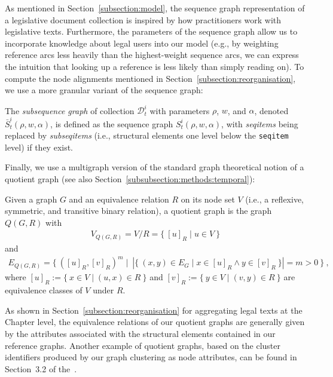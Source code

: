 As mentioned in Section~\ref{subsection:model},
the sequence graph representation of a legislative document collection is inspired by how practitioners work with legislative texts.
Furthermore, the parameters of the sequence graph allow us to incorporate knowledge about legal users into our model 
(e.g., by weighting reference arcs less heavily than the highest-weight sequence arcs, we can express the intuition that looking up a reference is less likely than simply reading on).
To compute the node alignments mentioned in Section~\ref{subsection:reorganisation}, 
we use a more granular variant of the sequence graph:

\begin{definition}\label{def:subsequencegraph}
	The \emph{subsequence graph} of collection $\mathcal{D}^i_t$ with parameters $\rho$, $w$, and $\alpha$, denoted $\bar{S}^i_t(\rho, w, \alpha)$, 
	is defined as the sequence graph $S^i_t(\rho, w, \alpha)$, with \emph{seqitems} being replaced by \emph{subseqitems} (i.e., structural elements one level below the \texttt{seqitem} level) if they exist.
\end{definition}

Finally, we use a multigraph version of the standard graph theoretical notion of a quotient graph (see also Section~\ref{subsubsection:methods:temporal}):

\begin{definition}
	Given a graph $G$ and an equivalence relation $R$ on its node set $V$ (i.e., a reflexive, symmetric, and transitive binary relation),
	a quotient graph is the graph $Q(G,R)$ with
	\begin{align*}
	V_{Q(G,R)} = V / R = \{~[u]_R \mid u\in V~\}
	\end{align*}
	and 
	\begin{align*}
	E_{Q(G,R)} = \{~([u]_R, [v]_R)^m \mid~|\{~(x,y) \in E_G \mid x\in [u]_R \wedge y\in [v]_R~\}| = m > 0~\}~, 
	\end{align*}
	where $[u]_R := \{~x\in V\mid (u,x)\in R~\}$ and $[v]_R := \{~y\in V\mid (v,y)\in R~\}$ are equivalence classes of $V$ under $R$.
\end{definition}

As shown in Section~\ref{subsection:reorganisation} for aggregating legal texts at the Chapter level,
the equivalence relations of our quotient graphs are generally given by the attributes associated with the structural elements contained in our reference graphs. 
Another example of quotient graphs, based on the cluster identifiers produced by our graph clustering as node attributes, can be found in Section~3.2 of the~\suppi. 

